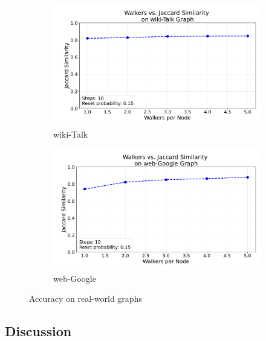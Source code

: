 \begin{figure}[H]
    \centering
    \begin{subfigure}[t]{0.5\linewidth}
        \centering
        \includegraphics[width=\linewidth]{images/plots/wiki-Talk/accuracy_plots_wiki_talk.pdf}
        \caption{wiki-Talk}
        \label{fig:wikirun}
    \end{subfigure}\hfill
    \begin{subfigure}[t]{0.5\linewidth}
        \centering
        \includegraphics[width=\linewidth]{images/plots/web-Google/accuracy_plots_web_google.pdf}
        \caption{web-Google}
        \label{fig:wikigibhrs}
    \end{subfigure}
    \caption{Accuracy on real-world graphs}
    \label{fig:wiki-comparison}
\end{figure}








\subsection{Discussion}

